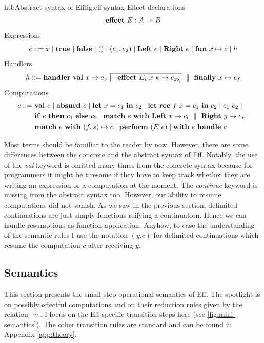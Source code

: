 \documentclass[class=article, crop=false]{standalone}
\begin{document}
\begin{myfigure}[.9]{htb}{Abstract syntax of Eff}{fig:eff-syntax}
Effect declarations
$$ \mathbf{effect}\  E : A \twoheadrightarrow B $$
%
Expressions
$$ e ::= x \mid
  \mathbf{true} \mid
  \mathbf{false} \mid
  () \mid
  (e_1, e_2) \mid
  \mathbf{Left}\  e \mid
  \mathbf{Right\ } e \mid
  \mathbf{fun}\  x \mapsto c \mid
  h $$
%
Handlers
$$ h ::= \mathbf{handler}\  \mathbf{val}\  x \mapsto c_v\ \overline{\parallel \ \mathbf{effect}\  E_i\ x\ k \to c_{\mathtt{op}_i} } \ \parallel \  \mathbf{finally}\  x \mapsto c_f $$
%
Computations
\begin{align*}
  c ::= \ &\mathbf{val}\  e \mid \mathbf{absurd}\  e \mid
    \mathbf{let}\  x = c_1 \ \mathbf{in}\  c_2 \mid
    \mathbf{let}\  \mathbf{rec}\  f\ x = c_1 \ \mathbf{in}\  c_2 \mid e_1\ e_2 \mid \\
    & \mathbf{if}\  e \ \mathbf{then}\  c_1 \ \mathbf{else}\  c_2 \mid
    \mathbf{match}\  e\ \mathbf{with}\  \mathbf{Left}\  x \mapsto c_l \ \parallel \  \mathbf{Right\ } y \mapsto c_r \mid\\
    & \mathbf{match}\  e\ \mathbf{with}\  (f, s) \mapsto c \mid \mathbf{perform}\  (E\ e) \mid
    \mathbf{with}\  e \ \mathbf{handle}\  c
\end{align*}
\end{myfigure}

Most terms should be familiar to the reader by now. However, there are some
differences between the concrete and the abstract syntax of Eff. Notably, the
use of the \emph{val} keyword is omitted many times from the concrete syntax
because for programmers it might be tiresome if they have to keep track whether
they are writing an expression or a computation at the moment. The
\emph{continue} keyword is missing from the abstract syntax too. However, our
ability to resume computations did not vanish. As we saw in the previous section,
delimited continuations are just simply functions reifying a continuation. Hence
we can handle resumptions as function application. Anyhow, to ease the
understanding of the semantic rules I use the notation $(y.c)$ for delimited
continuations which resume the computation $c$ after receiving $y$.

\subsection{Semantics}

This section presents the small step operational semantics of Eff. The spotlight
is on possibly effectful computations and on their reduction rules given by the
relation $\leadsto$. I focus on the Eff specific transition steps here (see
\autoref{fig:mini-semantics}). The other transition rules are standard and can
be found in Appendix \ref{app:theory}.
\end{document}
